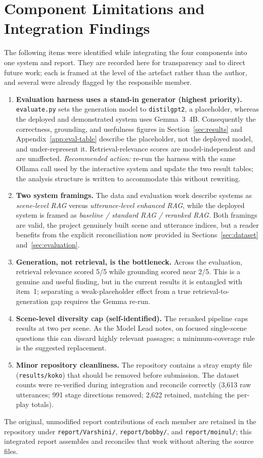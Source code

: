 \section{Component Limitations and Integration Findings}
\label{app:limitations}

The following items were identified while integrating the four components
into one system and report. They are recorded here for transparency and
to direct future work; each is framed at the level of the artefact rather
than the author, and several were already flagged by the responsible
member.

\begin{enumerate}
  \item \textbf{Evaluation harness uses a stand-in generator
  (highest priority).} \texttt{evaluate.py} sets the generation model to
  \texttt{distilgpt2}, a placeholder, whereas the deployed and demonstrated
  system uses Gemma~3~4B. Consequently the correctness, grounding, and
  usefulness figures in Section~\ref{sec:results} and
  Appendix~\ref{app:eval-table} describe the placeholder, not the deployed
  model, and under-represent it. Retrieval-relevance scores are
  model-independent and are unaffected. \emph{Recommended action:} re-run
  the harness with the same Ollama call used by the interactive system and
  update the two result tables; the analysis structure is written to
  accommodate this without rewriting.

  \item \textbf{Two system framings.} The data and evaluation work describe
  systems as \emph{scene-level RAG} versus \emph{utterance-level enhanced
  RAG}, while the deployed system is framed as \emph{baseline / standard
  RAG / reranked RAG}. Both framings are valid, the project genuinely built
  scene and utterance indices, but a reader benefits from the explicit
  reconciliation now provided in Sections~\ref{sec:dataset}
  and~\ref{sec:evaluation}.

  \item \textbf{Generation, not retrieval, is the bottleneck.} Across the
  evaluation, retrieval relevance scored 5/5 while grounding scored near
  2/5. This is a genuine and useful finding, but in the current results it
  is entangled with item~1; separating a weak-placeholder effect from a
  true retrieval-to-generation gap requires the Gemma re-run.

  \item \textbf{Scene-level diversity cap (self-identified).} The reranked
  pipeline caps results at two per scene. As the Model Lead notes, on
  focused single-scene questions this can discard highly relevant passages;
  a minimum-coverage rule is the suggested replacement.

  \item \textbf{Minor repository cleanliness.} The repository contains a
  stray empty file (\texttt{results/koko}) that should be removed before
  submission. The dataset counts were re-verified during integration and
  reconcile correctly (3{,}613 raw utterances; 991 stage directions
  removed; 2{,}622 retained, matching the per-play totals).
\end{enumerate}

The original, unmodified report contributions of each member are retained
in the repository under \texttt{report/Varshini/}, \texttt{report/bobby/},
and \texttt{report/moinul/}; this integrated report assembles and
reconciles that work without altering the source files.
